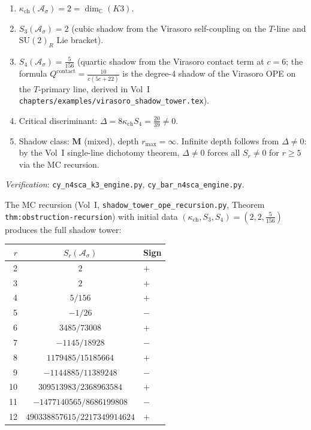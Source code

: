 \documentclass[11pt]{article}
\newcommand{\cA}{\mathcal{A}}
\newcommand{\C}{\mathbb{C}}
\begin{document}
\begin{proposition}
\label{prop:sigma-shadow}
\hfill
\begin{enumerate}[label=\textup{(\roman*)}]
 \item $\kappa_{\mathrm{ch}}(\cA_\sigma) = 2 = \dim_\C(K3)$.
 \item $S_3(\cA_\sigma) = 2$ (cubic shadow from the Virasoro self-coupling on the $T$-line and $\mathrm{SU}(2)_R$ Lie bracket).
 \item $S_4(\cA_\sigma) = \frac{5}{156}$ (quartic shadow from the Virasoro contact term at $c = 6$; the formula $Q^{\mathrm{contact}} = \frac{10}{c(5c+22)}$ is the degree-$4$ shadow of the Virasoro OPE on the $T$-primary line, derived in Vol~I \texttt{chapters/examples/virasoro\_shadow\_tower.tex}).
 \item Critical discriminant: $\Delta = 8\kappa_{\mathrm{ch}} S_4 = \frac{20}{39} \neq 0$.
 \item Shadow class: $\mathbf{M}$ (mixed), depth $r_{\max} = \infty$. Infinite depth follows from $\Delta \neq 0$: by the Vol~I single-line dichotomy theorem, $\Delta \neq 0$ forces all $S_r \neq 0$ for $r \geq 5$ via the MC recursion.
\end{enumerate}

\noindent\textit{Verification}: \texttt{cy\_n4sca\_k3\_engine.py}, \texttt{cy\_bar\_n4sca\_engine.py}.
\end{proposition}

\noindent The MC recursion (Vol~I, \texttt{shadow\_tower\_ope\_recursion.py}, Theorem \texttt{thm:obstruction-recursion}) with initial data $(\kappa_{\mathrm{ch}}, S_3, S_4) = (2, 2, \frac{5}{156})$ produces the full shadow tower:

\begin{center}
\renewcommand{\arraystretch}{1.2}
\begin{tabular}{rcl}
 \toprule
 $r$ & $S_r(\cA_\sigma)$ & Sign \\
 \midrule
 2 & $2$ & $+$ \\
 3 & $2$ & $+$ \\
 4 & $5/156$ & $+$ \\
 5 & $-1/26$ & $-$ \\
 6 & $3485/73008$ & $+$ \\
 7 & $-1145/18928$ & $-$ \\
 8 & $1179485/15185664$ & $+$ \\
 9 & $-1144885/11389248$ & $-$ \\
 10 & $309513983/2368963584$ & $+$ \\
 11 & $-1477140565/8686199808$ & $-$ \\
 12 & $490338857615/2217349914624$ & $+$ \\
 \bottomrule
\end{tabular}
\end{center}
\end{document}
